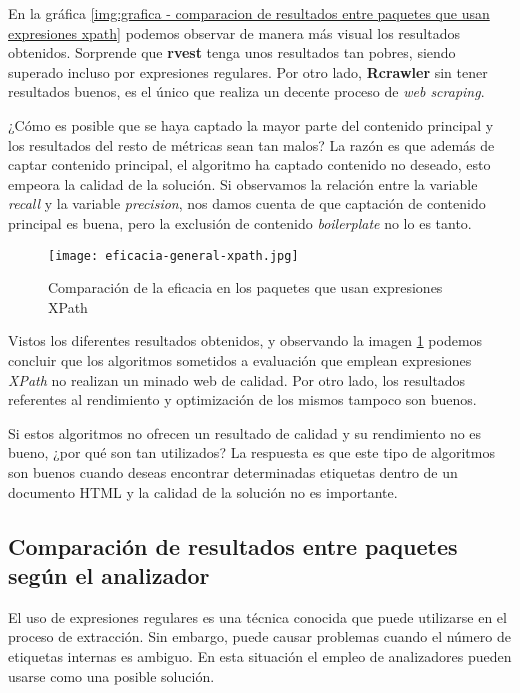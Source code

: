 En la gráfica \ref{img:grafica - comparacion de resultados entre paquetes que usan expresiones xpath} 
podemos observar de manera más visual los resultados obtenidos. Sorprende que \textbf{rvest} tenga unos 
resultados tan pobres, siendo superado incluso por expresiones regulares. Por otro lado, \textbf{Rcrawler} 
sin tener resultados buenos, es el único que realiza un decente proceso de \emph{web scraping}.

¿Cómo es posible que se haya captado la mayor parte del contenido principal y los resultados del resto de
métricas sean tan malos? La razón es que además de captar contenido principal, el algoritmo ha captado
contenido no deseado, esto empeora la calidad de la solución. Si observamos la relación entre la variable
\emph{recall} y la variable \emph{precision}, nos damos cuenta de que captación de contenido principal es
buena, pero la exclusión de contenido \emph{boilerplate} no lo es tanto.

\begin{figure}[tphb]
    \centering
    \texttt{[image: eficacia-general-xpath.jpg]}
    \caption{Comparación de la eficacia en los paquetes que usan expresiones XPath}
    \label{img:comparacion de la eficacia en los paquetes que usan expresiones xpath}
\end{figure}

Vistos los diferentes resultados obtenidos, y observando la imagen 
\ref{img:comparacion de la eficacia en los paquetes que usan expresiones xpath} podemos concluir que los 
algoritmos sometidos a evaluación que emplean expresiones \emph{XPath} no realizan un minado web de calidad. 
Por otro lado, los resultados referentes al rendimiento y optimización de los mismos tampoco son buenos.

Si estos algoritmos no ofrecen un resultado de calidad y su rendimiento no es bueno, ¿por qué son tan
utilizados? La respuesta es que este tipo de algoritmos son buenos cuando deseas encontrar determinadas
etiquetas dentro de un documento HTML y la calidad de la solución no es importante. 

\subsection{Comparación de resultados entre paquetes según el analizador}
\label{subsec:comparacion de resultados entre paquetes segun el analizador}

El uso de expresiones regulares es una técnica conocida que puede utilizarse en el proceso de extracción.
Sin embargo, puede causar problemas cuando el número de etiquetas internas es ambiguo. En esta situación
el empleo de analizadores pueden usarse como una posible solución.

